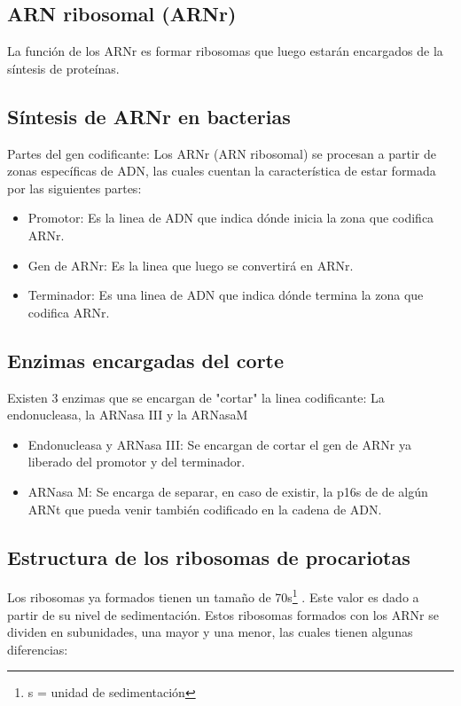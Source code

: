 \subsection{ARN ribosomal (ARNr)}

La función de los ARNr es formar ribosomas que luego estarán encargados de la síntesis de proteínas.

\subsection{Síntesis de ARNr en bacterias}

Partes del gen codificante: Los ARNr (ARN ribosomal) se procesan a partir de zonas específicas de ADN, las cuales cuentan la característica de estar formada por las siguientes partes:

\begin{itemize}
    \item Promotor: Es la linea de ADN que indica dónde inicia la zona que codifica ARNr.
    \item Gen de ARNr: Es la linea que luego se convertirá en ARNr.
    \item Terminador: Es una linea de ADN que indica dónde termina la zona que codifica ARNr.
\end{itemize}

\subsection{Enzimas encargadas del corte}

Existen 3 enzimas que se encargan de "cortar" la linea codificante: La endonucleasa, la ARNasa III y la ARNasaM

\begin{itemize}
    \item Endonucleasa y ARNasa III: Se encargan de cortar el gen de ARNr ya liberado del promotor y del terminador.
    \item ARNasa M: Se encarga de separar, en caso de existir, la p16s de de algún ARNt que pueda venir también codificado en la cadena de ADN.
\end{itemize}

\subsection{Estructura de los ribosomas de procariotas}

Los ribosomas ya formados tienen un tamaño de 70s\footnote{s = unidad de sedimentación} . Este valor es dado a partir de su nivel de sedimentación.
Estos ribosomas formados con los ARNr se dividen en subunidades, una mayor y una menor, las cuales tienen algunas diferencias:

